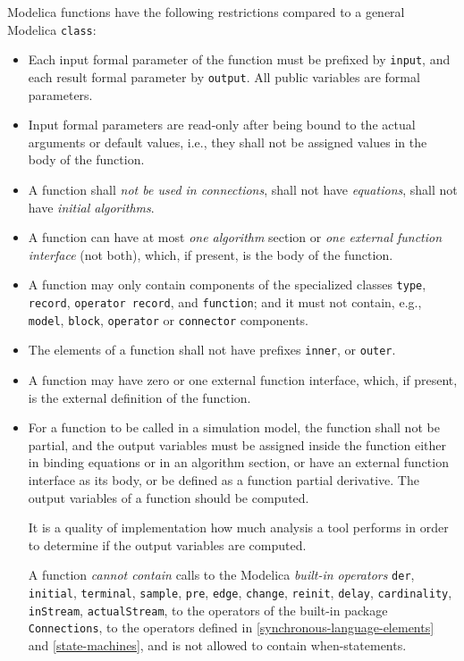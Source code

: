 Modelica functions have the following restrictions compared to a general
Modelica \lstinline!class!:
\begin{itemize}
\item
  Each input formal parameter of the function must be prefixed by \lstinline!input!, and each result formal parameter by \lstinline!output!.
  All public variables are formal parameters.
\item
  Input formal parameters are read-only after being bound to the actual
  arguments or default values, i.e., they shall not be assigned values in
  the body of the function.
\item
  A function shall \emph{not be used in connections}, shall not have
  \emph{equations}, shall not have \emph{initial algorithms}.
\item
  A function can have at most \emph{one algorithm} section or \emph{one
  external function interface} (not both), which, if present, is the
  body of the function.
\item
  A function may only contain components of the specialized classes \lstinline!type!, \lstinline!record!, \lstinline!operator record!, and \lstinline!function!; and it must not contain, e.g., \lstinline!model!, \lstinline!block!, \lstinline!operator! or \lstinline!connector! components.
\item
  The elements of a function shall not have prefixes \lstinline!inner!, or \lstinline!outer!.
\item
  A function may have zero or one external function interface, which, if
  present, is the external definition of the function.
\item
  For a function to be called in a simulation model, the function shall
  not be partial, and the output variables must be assigned inside the
  function either in binding equations or in an algorithm section,
  or have an external function interface as its body, or be defined as a
  function partial derivative. The output variables of a function should
  be computed.
  \begin{nonnormative}
  It is a quality of implementation how much analysis a tool performs in order to determine if the output variables are computed.
  \end{nonnormative}
  A function \emph{cannot contain} calls to the Modelica \emph{built-in operators} \lstinline!der!, \lstinline!initial!, \lstinline!terminal!, \lstinline!sample!, \lstinline!pre!, \lstinline!edge!, \lstinline!change!, \lstinline!reinit!, \lstinline!delay!, \lstinline!cardinality!, \lstinline!inStream!, \lstinline!actualStream!, to the operators of the built-in package \lstinline!Connections!, to the operators defined in \cref{synchronous-language-elements} and \cref{state-machines}, and is not allowed to contain when-statements.

\end{itemize}
